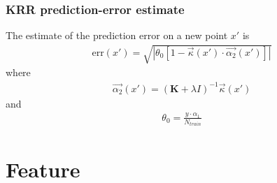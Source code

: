 \documentclass[english,a4paper,oneside, twocolumn,article,9pt]{memoir}
\newcommand{\mb}[1]{\mathbf{#1}}
\begin{document}
\subsection{KRR prediction-error estimate}
The estimate of the prediction error on a new point $x'$ is
\begin{align}
\text{err}(x') = \sqrt{\left|\theta_0[1-\vec{\kappa}(x')\cdot\vec{\alpha_2}(x')]\right|}
\end{align}
where
\begin{align*}
\vec{\alpha_2}(x') = (\mb{K} + \lambda I)^{-1}\vec{\kappa}(x')
\end{align*}
and
\begin{align*}
\theta_0 = \frac{y\cdot \alpha_1}{N_{train}}
\end{align*}


\chapter{Feature}
\end{document}
